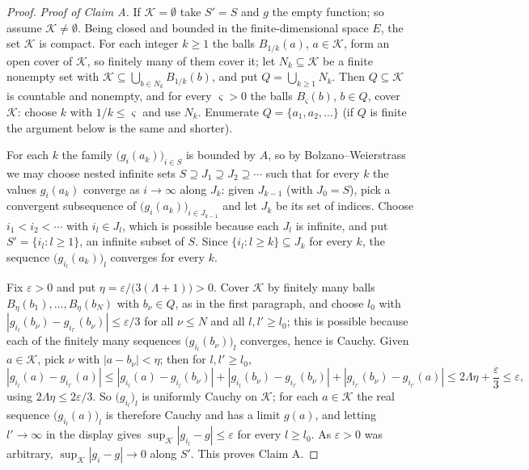 \begin{proof}
\emph{Proof of Claim A.} If $\mathcal K=\emptyset$ take $S'=S$ and $g$ the empty
function; so assume $\mathcal K\ne\emptyset$. Being closed and bounded in the
finite-dimensional space $E$, the set $\mathcal K$ is compact. For each integer
$k\ge1$ the balls $B_{1/k}(a)$, $a\in\mathcal K$, form an open cover of
$\mathcal K$, so finitely many of them cover it; let $N_k\subseteq\mathcal K$ be
a finite nonempty set with
$\mathcal K\subseteq\bigcup_{b\in N_k}B_{1/k}(b)$, and put
$Q=\bigcup_{k\ge1}N_k$. Then $Q\subseteq\mathcal K$ is countable and nonempty,
and for every $\varsigma>0$ the balls $B_\varsigma(b)$, $b\in Q$, cover
$\mathcal K$: choose $k$ with $1/k\le\varsigma$ and use $N_k$. Enumerate
$Q=\{a_1,a_2,\dots\}$ (if $Q$ is finite the argument below is the same and
shorter).

For each $k$ the family $\bigl(g_i(a_k)\bigr)_{i\in S}$ is bounded by $A$, so by
Bolzano--Weierstrass we may choose nested infinite sets
$S\supseteq J_1\supseteq J_2\supseteq\cdots$ such that for every $k$ the values
$g_i(a_k)$ converge as $i\to\infty$ along $J_k$: given $J_{k-1}$ (with
$J_0=S$), pick a convergent subsequence of $\bigl(g_i(a_k)\bigr)_{i\in J_{k-1}}$
and let $J_k$ be its set of indices. Choose $i_1<i_2<\cdots$ with $i_l\in J_l$,
which is possible because each $J_l$ is infinite, and put
$S'=\{i_l:l\ge1\}$, an infinite subset of $S$. Since
$\{i_l:l\ge k\}\subseteq J_k$ for every $k$, the sequence
$\bigl(g_{i_l}(a_k)\bigr)_l$ converges for every $k$.

Fix $\varepsilon>0$ and put $\eta=\varepsilon/\bigl(3(\Lambda+1)\bigr)>0$. Cover
$\mathcal K$ by finitely many balls $B_\eta(b_1),\dots,B_\eta(b_N)$ with
$b_\nu\in Q$, as in the first paragraph, and choose $l_0$ with
$|g_{i_l}(b_\nu)-g_{i_{l'}}(b_\nu)|\le\varepsilon/3$ for all $\nu\le N$ and all
$l,l'\ge l_0$; this is possible because each of the finitely many sequences
$\bigl(g_{i_l}(b_\nu)\bigr)_l$ converges, hence is Cauchy. Given
$a\in\mathcal K$, pick $\nu$ with $|a-b_\nu|<\eta$; then for $l,l'\ge l_0$,
\[
  |g_{i_l}(a)-g_{i_{l'}}(a)|
   \le|g_{i_l}(a)-g_{i_l}(b_\nu)|
     +|g_{i_l}(b_\nu)-g_{i_{l'}}(b_\nu)|
     +|g_{i_{l'}}(b_\nu)-g_{i_{l'}}(a)|
   \le2\Lambda\eta+\frac\varepsilon3\le\varepsilon ,
\]
using $2\Lambda\eta\le2\varepsilon/3$. So $\bigl(g_{i_l}\bigr)_l$ is uniformly
Cauchy on $\mathcal K$; for each $a\in\mathcal K$ the real sequence
$\bigl(g_{i_l}(a)\bigr)_l$ is therefore Cauchy and has a limit $g(a)$, and
letting $l'\to\infty$ in the display gives
$\sup_{\mathcal K}|g_{i_l}-g|\le\varepsilon$ for every $l\ge l_0$. As
$\varepsilon>0$ was arbitrary, $\sup_{\mathcal K}|g_i-g|\to0$ along $S'$. This
proves Claim A.


\end{proof}
